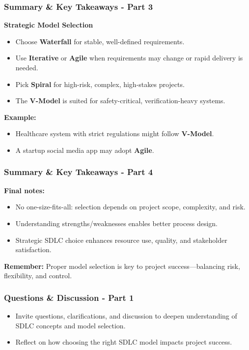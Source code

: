 \documentclass{beamer}
\begin{document}
\begin{frame}[fragile]
    \frametitle{Summary & Key Takeaways - Part 3}
    \textbf{Strategic Model Selection}
    
    \begin{itemize}
        \item Choose \textbf{Waterfall} for stable, well-defined requirements.
        \item Use \textbf{Iterative} or \textbf{Agile} when requirements may change or rapid delivery is needed.
        \item Pick \textbf{Spiral} for high-risk, complex, high-stakes projects.
        \item The \textbf{V-Model} is suited for safety-critical, verification-heavy systems.
    \end{itemize}
    
    \textbf{Example:} 
    \begin{itemize}
        \item Healthcare system with strict regulations might follow \textbf{V-Model}.
        \item A startup social media app may adopt \textbf{Agile}.
    \end{itemize}
\end{frame}

\begin{frame}[fragile]
    \frametitle{Summary & Key Takeaways - Part 4}
    \textbf{Final notes:}
    \begin{itemize}
        \item No one-size-fits-all: selection depends on project scope, complexity, and risk.
        \item Understanding strengths/weaknesses enables better process design.
        \item Strategic SDLC choice enhances resource use, quality, and stakeholder satisfaction.
    \end{itemize}
    
    \textbf{Remember:} Proper model selection is key to project success—balancing risk, flexibility, and control.
\end{frame}

\begin{frame}[fragile]
  \frametitle{Questions \& Discussion - Part 1}
  \begin{itemize}
    \item Invite questions, clarifications, and discussion to deepen understanding of SDLC concepts and model selection.
    \item Reflect on how choosing the right SDLC model impacts project success.
  \end{itemize}
\end{frame}
\end{document}
